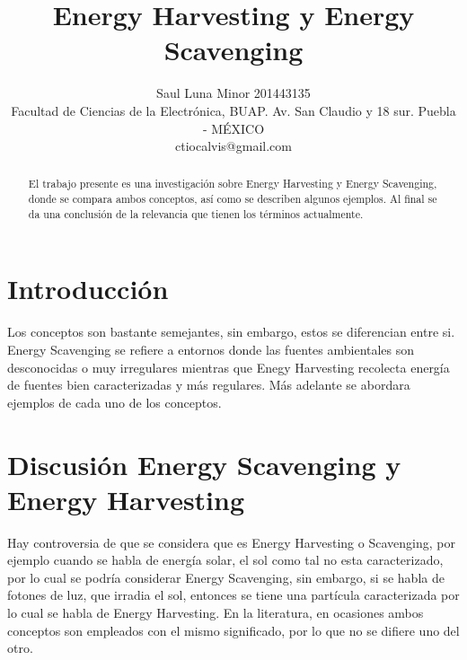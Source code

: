 \documentclass[journal, a4paper]{IEEEtran}
\begin{document}
	\title{Energy Harvesting y Energy Scavenging}
	\author{Saul Luna Minor 201443135
	\\Facultad de Ciencias de la Electrónica, BUAP. Av. San Claudio y 18 sur. Puebla - MÉXICO
	\\ctiocalvis@gmail.com}
	\maketitle

\begin{abstract}
  El trabajo presente es una investigación sobre Energy Harvesting y Energy Scavenging, donde se compara ambos conceptos, así como se describen algunos ejemplos. Al final se da una conclusión de la relevancia que tienen los términos actualmente.  
\end{abstract}

\section{Introducción}
	Los conceptos son bastante semejantes, sin embargo, estos se diferencian entre si. Energy Scavenging\citep{Priya2009} se refiere a entornos donde las fuentes ambientales son desconocidas o muy irregulares mientras que Enegy Harvesting\citep{Priya2009}  recolecta energía de fuentes bien caracterizadas y más regulares. Más adelante se abordara ejemplos de cada uno de los conceptos. 

\section{Discusión Energy Scavenging y Energy Harvesting}
Hay controversia de que se considera que es Energy Harvesting o Scavenging, por ejemplo cuando se habla de energía solar, el sol como tal no esta caracterizado, por lo cual se podría considerar Energy Scavenging, sin embargo, si se habla de fotones de luz, que irradia el sol, entonces se tiene una partícula caracterizada por lo cual se habla de Energy Harvesting. En la literatura, en ocasiones ambos conceptos son empleados con el mismo significado, por lo que no se difiere uno del otro. 
\end{document}
